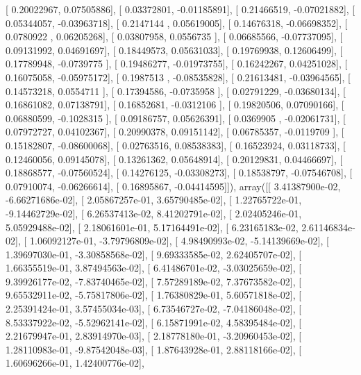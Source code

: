 \documentclass{article}
\begin{document}
       [ 0.20022967,  0.07505886],
       [ 0.03372801, -0.01185891],
       [ 0.21466519, -0.07021882],
       [ 0.05344057, -0.03963718],
       [ 0.2147144 ,  0.05619005],
       [ 0.14676318, -0.06698352],
       [ 0.0780922 ,  0.06205268],
       [ 0.03807958,  0.0556735 ],
       [ 0.06685566, -0.07737095],
       [ 0.09131992,  0.04691697],
       [ 0.18449573,  0.05631033],
       [ 0.19769938,  0.12606499],
       [ 0.17789948, -0.0739775 ],
       [ 0.19486277, -0.01973755],
       [ 0.16242267,  0.04251028],
       [ 0.16075058, -0.05975172],
       [ 0.1987513 , -0.08535828],
       [ 0.21613481, -0.03964565],
       [ 0.14573218,  0.0554711 ],
       [ 0.17394586, -0.0735958 ],
       [ 0.02791229, -0.03680134],
       [ 0.16861082,  0.07138791],
       [ 0.16852681, -0.0312106 ],
       [ 0.19820506,  0.07090166],
       [ 0.06880599, -0.1028315 ],
       [ 0.09186757,  0.05626391],
       [ 0.0369905 , -0.02061731],
       [ 0.07972727,  0.04102367],
       [ 0.20990378,  0.09151142],
       [ 0.06785357, -0.0119709 ],
       [ 0.15182807, -0.08600068],
       [ 0.02763516,  0.08538383],
       [ 0.16523924,  0.03118733],
       [ 0.12460056,  0.09145078],
       [ 0.13261362,  0.05648914],
       [ 0.20129831,  0.04466697],
       [ 0.18868577, -0.07560524],
       [ 0.14276125, -0.03308273],
       [ 0.18538797, -0.07546708],
       [ 0.07910074, -0.06266614],
       [ 0.16895867, -0.04414595]]), array([[  3.41387900e-02,  -6.66271686e-02],
       [  2.05867257e-01,   3.65790485e-02],
       [  1.22765722e-01,  -9.14462729e-02],
       [  6.26537413e-02,   8.41202791e-02],
       [  2.02405246e-01,   5.05929488e-02],
       [  2.18061601e-01,   5.17164491e-02],
       [  6.23165183e-02,   2.61146834e-02],
       [  1.06092127e-01,  -3.79796809e-02],
       [  4.98490993e-02,  -5.14139669e-02],
       [  1.39697030e-01,  -3.30858568e-02],
       [  9.69333585e-02,   2.62405707e-02],
       [  1.66355519e-01,   3.87494563e-02],
       [  6.41486701e-02,  -3.03025659e-02],
       [  9.39926177e-02,  -7.83740465e-02],
       [  7.57289189e-02,   7.37673582e-02],
       [  9.65532911e-02,  -5.75817806e-02],
       [  1.76380829e-01,   5.60571818e-02],
       [  2.25391424e-01,   3.57455034e-03],
       [  6.73546727e-02,  -7.04186048e-02],
       [  8.53337922e-02,  -5.52962141e-02],
       [  6.15871991e-02,   4.58395484e-02],
       [  2.21679947e-01,   2.83914970e-03],
       [  2.18778180e-01,  -3.20960453e-02],
       [  1.28110983e-01,  -9.87542048e-03],
       [  1.87643928e-01,   2.88118166e-02],
       [  1.60696266e-01,   1.42400776e-02],
\end{document}
